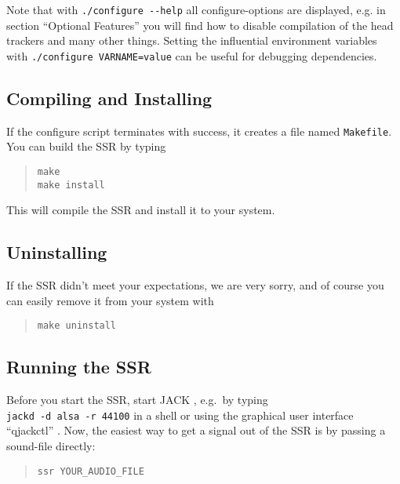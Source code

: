 Note that with \verb+./configure --help+ all configure-options are displayed,
e.g. in section ``Optional Features'' you will find how to
disable compilation of the head trackers
and many other things.
Setting the influential environment variables with
\verb+./configure VARNAME=value+ can be useful for debugging dependencies.

\subsection{Compiling and Installing}
\label{sec:comp_inst}

If the configure script terminates with success, it creates a file named 
\texttt{Makefile}. You can build the SSR by typing

\begin{quote}
\texttt{make}\\
\texttt{make install}
\end{quote}
%
This will compile the SSR and install it to your system.

\subsection{Uninstalling}

If the SSR didn't meet your expectations, we are very sorry, and of course you
can easily remove it from your system with
\begin{quote}
\texttt{make uninstall}
\end{quote}

\subsection{Running the SSR}
\label{sec:running_ssr}

Before you start the SSR, start JACK \cite{jack}, e.g.~by typing\\
\verb+jackd -d alsa -r 44100+ in a shell or using the graphical user
interface ``qjackctl'' \cite{qjackctl}.
Now, the easiest way to get a signal out of the SSR is
by passing a sound-file directly:

\begin{quote}
\begin{verbatim}
ssr YOUR_AUDIO_FILE
\end{verbatim}
\end{quote}

